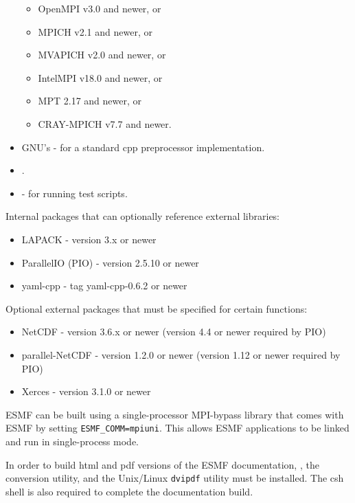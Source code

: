 \begin{itemize}
  \begin{itemize}
  \item OpenMPI v3.0 and newer, or
  \item MPICH v2.1 and newer, or
  \item MVAPICH v2.0 and newer, or
  \item IntelMPI v18.0 and newer, or
  \item MPT 2.17 and newer, or
  \item CRAY-MPICH v7.7 and newer.
  \end{itemize}
\item GNU's  -
for a standard cpp preprocessor implementation.
\item {}.
\item {} - for running
test scripts.
\end{itemize}

Internal packages that can optionally reference external libraries:
\begin{itemize}
\item LAPACK - version 3.x or newer
\item ParallelIO (PIO) - version 2.5.10 or newer
\item yaml-cpp - tag yaml-cpp-0.6.2 or newer
\end{itemize}

Optional external packages that must be specified for certain functions:
\begin{itemize}
\item NetCDF - version 3.6.x or newer (version 4.4 or newer required by PIO)
\item parallel-NetCDF - version 1.2.0 or newer (version 1.12 or newer required by PIO)
\item Xerces - version 3.1.0 or newer
\end{itemize}

ESMF can be built using a single-processor MPI-bypass library
that comes with ESMF by setting {\tt ESMF\_COMM=mpiuni}. This allows ESMF applications
to be linked and run in single-process mode.

In order to build html and pdf versions of the ESMF documentation, 
,
the 
conversion utility, and the Unix/Linux {\tt dvipdf} utility must be installed.
The csh shell is also required to complete the documentation build.
